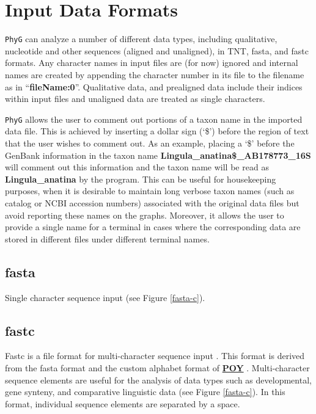 \documentclass[11pt]{book}
\newcommand{\phyg}{\texttt{PhyG} }
\begin{document}
{{		
\section{Input Data Formats} 
	\phyg can analyze a number of different data types, including qualitative, nucleotide
	and other sequences  
	(aligned and unaligned), in TNT, fasta, and fastc formats. Any character names in 
	input files are (for now) ignored and internal names are created by appending 
	the character number in its file to the filename as in ``\textbf{fileName:0}''. 
	Qualitative data, and prealigned data include their indices within input files and 
	unaligned data are treated as single characters.
	
	\phyg allows the user to comment out portions of a taxon name 
	in the imported data file. This is achieved by inserting a dollar sign (`\$') before the region 
	of text that the user wishes to comment out. As an example, placing a `\$' before the 
	GenBank information in the taxon name \textbf{Lingula\_anatina\$\_AB178773\_16S} 
	will comment out this information and the taxon name will be read as 
	\textbf{Lingula\_anatina} by the program. This can be useful for housekeeping purposes, 
	when it is desirable to maintain long verbose taxon names (such as catalog or NCBI 
	accession numbers) associated with the original data files but avoid reporting these 
	names on the graphs. Moreover, it allows the user to provide a single name for a terminal
	in cases where the corresponding data are stored in different files under different terminal
	names.
		
	\subsection{fasta}
		Single character sequence input \citep{PearsonandLipman1988} (see Figure 
		\ref{fasta-c}).
		
	\subsection{fastc}
		Fastc is a file format for multi-character sequence input \citep{WheelerandWashburn2019}.
		This format is derived from the fasta format and the custom alphabet format of 
		 \href{https://github.com/wardwheeler/POY5}{\textbf{POY}} \citep{POY4,POY5}. 
		 Multi-character sequence elements are useful for the analysis of data types such 
		 as developmental, gene synteny, and comparative linguistic data (see Figure 
		 \ref{fasta-c}).  In this format, individual sequence elements are separated by a space.
		 
}}
\end{document}
